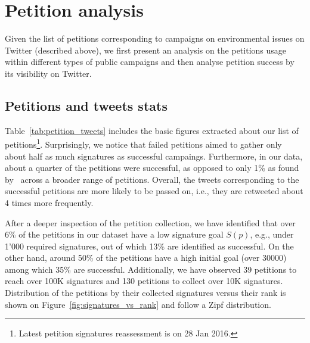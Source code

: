 \section{Petition analysis}
\label{sec:petition_analysis}

Given the list of petitions corresponding to campaigns on environmental issues on Twitter (described above), we first present an analysis on the petitions usage within different types of public campaigns and then analyse petition success by its visibility on Twitter.

\subsection{Petitions and tweets stats}
Table~\ref{tab:petition_tweets} includes the basic figures extracted about our list of petitions\footnote{Latest petition signatures reassessment is on 28 Jan 2016.}.
Surprisingly, we notice that failed petitions aimed to gather only about half as much signatures as successful campaings.
Furthermore, in our data, about a quarter of the petitions were successful, as opposed to only 1\% as found by~\cite{Huang2015} across a broader range of petitions.
Overall, the tweets corresponding to the successful petitions are more likely to be passed on, i.e., they are retweeted about 4 times more frequently.

After a deeper inspection of the petition collection, we have identified that over 6\% of the petitions in our dataset have a low signature goal $S(p)$, e.g., under 1'000 required signatures, out of which 13\% are identified as successful.
On the other hand, around 50\% of the petitions have a high initial goal (over \num{30000}) among which 35\% are successful.
Additionally, we have observed 39 petitions to reach over 100K signatures and 130 petitions to collect over 10K signatures.
Distribution of the petitions by their collected signatures versus their rank is shown on Figure~\ref{fig:signatures_vs_rank} and follow a Zipf distribution.

